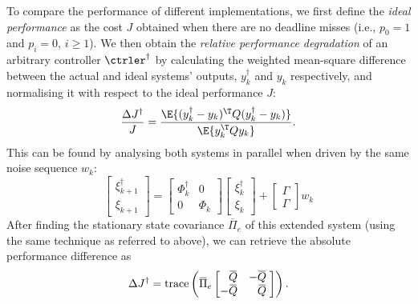 To compare the performance of different implementations, we first define the \emph{ideal performance} as the cost $J$ obtained when there are no deadline misses (i.e., $p_0 = 1$ and $p_i = 0$, $i \geq 1$).
We then obtain the \emph{relative performance degradation} of an arbitrary controller $\ctrler^{\dagger}$ by calculating the weighted mean-square difference between the actual and ideal systems' outputs, $y^{\dagger}_k$ and $y_k$ respectively, and normalising it with respect to the ideal performance $J$:
\begin{equation}
    \label{eq:relcost}
    \frac{\Delta J^{\dagger}}{J} = \frac{\E{ (y^{\dagger}_k - y_k)^{\T} Q (y^{\dagger}_k - y_k) }}{ \E{ y_k^{\T} Q y_k }}.
\end{equation}
This can be found by analysing both systems in parallel when driven by the same noise sequence $w_k$:
\begin{equation*}
    \begin{bmatrix}
    \xi_{k+1}^\dagger \\ \xi_{k+1}%
    \end{bmatrix} =
    \begin{bmatrix}
    \Phi_k^\dagger & 0 \\ 0 & \Phi_k%
    \end{bmatrix}
    \begin{bmatrix}
    \xi_k^\dagger \\ \xi_k%
    \end{bmatrix} +
    \begin{bmatrix}
    \Gamma \\ \Gamma
    \end{bmatrix} w_k
\end{equation*}
After finding the stationary state covariance $\overbar{\Pi}_e$ of this extended system (using the same technique as referred to above), we can retrieve the absolute performance difference as
\begin{equation*}
    \label{eq:deltaJ}
 \Delta J^{\dagger} = \operatorname{trace} \funof{ \overbar{\Pi}_e  \begin{bmatrix}
    \phantom{-}\overbar{Q} & -\overbar{Q}\phantom{,} \\
    -\overbar{Q} & \phantom{-}\overbar{Q}\phantom{,}
    \end{bmatrix} }.
\end{equation*}

